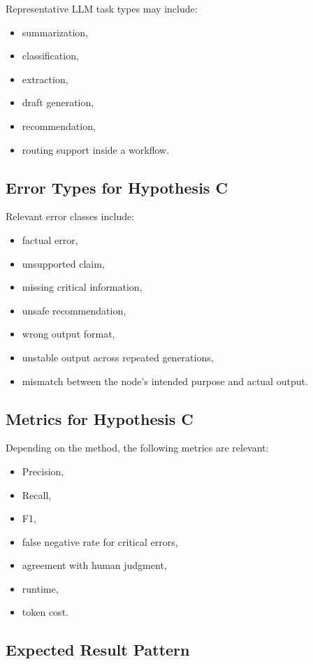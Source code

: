 \documentclass[12pt,a4paper]{article}
\begin{document}
Representative LLM task types may include:

\begin{itemize}
  \item summarization,
  \item classification,
  \item extraction,
  \item draft generation,
  \item recommendation,
  \item routing support inside a workflow.
\end{itemize}

\subsection{Error Types for Hypothesis C}

Relevant error classes include:

\begin{itemize}
  \item factual error,
  \item unsupported claim,
  \item missing critical information,
  \item unsafe recommendation,
  \item wrong output format,
  \item unstable output across repeated generations,
  \item mismatch between the node's intended purpose and actual output.
\end{itemize}

\subsection{Metrics for Hypothesis C}

Depending on the method, the following metrics are relevant:

\begin{itemize}
  \item Precision,
  \item Recall,
  \item F1,
  \item false negative rate for critical errors,
  \item agreement with human judgment,
  \item runtime,
  \item token cost.
\end{itemize}

\subsection{Expected Result Pattern}
\end{document}
